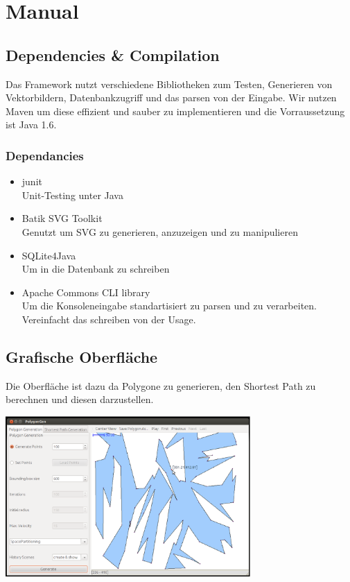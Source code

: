 \section{Manual}
\label{sec:manual}
\subsection{Dependencies \& Compilation}
Das Framework nutzt verschiedene Bibliotheken zum Testen, Generieren von Vektorbildern, Datenbankzugriff und das parsen von der Eingabe. Wir nutzen Maven um diese effizient und sauber zu implementieren und die Vorraussetzung ist Java 1.6.
\subsubsection{Dependancies}
\begin{itemize}
	\item junit\\
	Unit-Testing unter Java
	\item Batik SVG Toolkit\\
	Genutzt um SVG zu generieren, anzuzeigen und zu manipulieren
	\item SQLite4Java\\
	Um in die Datenbank zu schreiben
	\item Apache Commons CLI library\\
	Um die Konsoleneingabe standartisiert zu parsen und zu verarbeiten. Vereinfacht das schreiben von der Usage.
\end{itemize}

\subsection{Grafische Oberfläche}
Die Oberfläche ist dazu da Polygone zu generieren, den Shortest Path zu berechnen und diesen darzustellen.\\
\begin{center}
\includegraphics[width=0.7\textwidth]{img/GUI.eps}
\end{center}

